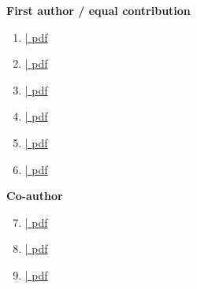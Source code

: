 


\begin{cvparagraph}
\textbf{First author / equal contribution}

\begin{enumerate}
\item {}\label{paper:diffusion} \href{https://github.com/brambozz/publications/raw/main/pdf/2023medical.pdf}{| \textcolor{awesome}{pdf}}
\item {}\label{paper:midl} \href{https://github.com/brambozz/publications/raw/main/pdf/2021cine.pdf}{| \textcolor{awesome}{pdf}}
\item {}\label{paper:uncertainty} \href{https://github.com/brambozz/publications/raw/main/pdf/2022uncertainty.pdf}{| \textcolor{awesome}{pdf}}
\item {}\label{paper:hopping} \href{https://github.com/brambozz/publications/raw/main/pdf/2022hopping.pdf}{| \textcolor{awesome}{pdf}}
\item {}\label{paper:inter} \href{https://github.com/brambozz/publications/raw/main/pdf/2023inter.pdf}{| \textcolor{awesome}{pdf}}
\item {}\label{paper:quantifiable} \href{https://github.com/brambozz/publications/raw/main/pdf/2023quantifiable.pdf}{| \textcolor{awesome}{pdf}}
\end{enumerate}

\textbf{Co-author}
\begin{enumerate}
\setcounter{enumi}{6}
\item {}\label{paper:flare} \href{https://github.com/brambozz/publications/raw/main/pdf/2023flare.pdf}{| \textcolor{awesome}{pdf}}
\item {}\label{paper:covid} \href{https://github.com/brambozz/publications/raw/main/pdf/2021automated.pdf}{| \textcolor{awesome}{pdf}}
\item {}\label{paper:nature} \href{https://github.com/brambozz/publications/raw/main/pdf/2020classification.pdf}{| \textcolor{awesome}{pdf}}
\end{enumerate}
\end{cvparagraph}
